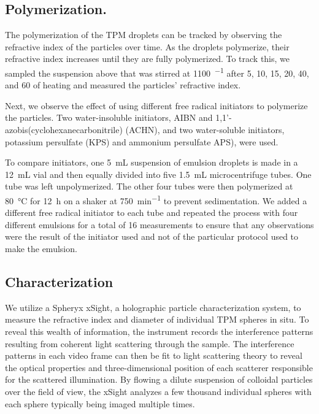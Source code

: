 
\subsection{Polymerization.}

The polymerization of the TPM droplets can be tracked by observing the 
refractive index of the particles over time. As the droplets polymerize, 
their refractive index increases until they are fully polymerized. To track 
this, we sampled the suspension above that was stirred at \SI{1100}{\min^{-1}}
after \si{5}, \si{10}, \si{15}, \si{20}, \si{40}, and \SI{60}{\min} of 
heating and measured the particles' refractive index. 


Next, we observe the effect of using different free radical initiators 
to polymerize the particles. Two water-insoluble initiators, AIBN and
\num{1},\num{1}'-azobis(cyclohexanecarbonitrile) (ACHN), and two water-soluble 
initiators, potassium persulfate (KPS) and ammonium persulfate APS), were 
used.


To compare initiators, one \SI{5}{\milli \liter} suspension of emulsion droplets is made in a \SI{12}{\milli \liter} vial and then
equally divided into five \SI{1.5}{\milli \liter} microcentrifuge tubes. One tube was left unpolymerized. The other four tubes were then polymerized at \SI{80}{\celsius} 
for \SI{12}{\hour} on a shaker at \SI{750}{\minute^{-1}} %
to prevent sedimentation.
We added a different free radical initiator to each tube and repeated the process with four different emulsions for a total of 
\num{16} measurements to ensure that any observations were the result of the 
initiator used and not of the particular protocol used to make the emulsion.

\subsection{Characterization}

We utilize a Spheryx xSight, a holographic particle characterization system, to measure the 
refractive index and diameter of individual TPM spheres in situ. To reveal
this wealth of information, the instrument records the interference patterns
resulting from coherent light scattering through the sample. The interference
patterns in each video frame can then be fit to light scattering theory
to reveal the optical properties and three-dimensional position of each 
scatterer responsible for the scattered illumination. 
By flowing a dilute suspension of colloidal particles over the field of view, the xSight analyzes a few 
thousand individual spheres with each sphere typically being imaged multiple times.

